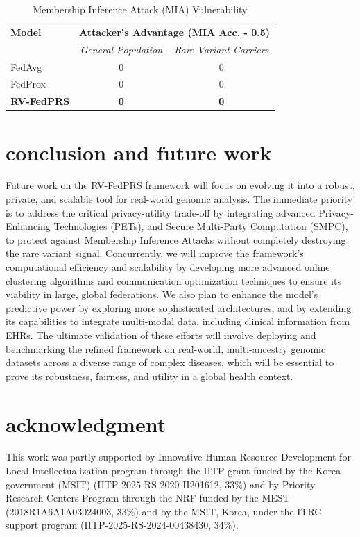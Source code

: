 \documentclass[conference]{IEEEtran}
\begin{document}
\begin{table}[h!]
\centering
\caption{Membership Inference Attack (MIA) Vulnerability}
\label{tab:privacy}
\begin{tabular}{lcc}
\hline
\textbf{Model} & \multicolumn{2}{c}{\textbf{Attacker's Advantage (MIA Acc. - 0.5)}} \\
& \textit{General Population} & \textit{Rare Variant Carriers} \\ \hline
FedAvg & 0 & 0 \\
FedProx & 0 & 0 \\
\textbf{RV-FedPRS} & \textbf{0} & \textbf{0} \\ \hline
\end{tabular}
\end{table}

\section{conclusion and future work}
\label{conclude}
Future work on the RV-FedPRS framework will focus on evolving it into a robust, private, and scalable tool for real-world genomic analysis. The immediate priority is to address the critical privacy-utility trade-off by integrating advanced Privacy-Enhancing Technologies (PETs), and Secure Multi-Party Computation (SMPC), to protect against Membership Inference Attacks without completely destroying the rare variant signal. Concurrently, we will improve the framework's computational efficiency and scalability by developing more advanced online clustering algorithms and communication optimization techniques to ensure its viability in large, global federations. We also plan to enhance the model's predictive power by exploring more sophisticated architectures, and by extending its capabilities to integrate multi-modal data, including clinical information from EHRs. The ultimate validation of these efforts will involve deploying and benchmarking the refined framework on real-world, multi-ancestry genomic datasets across a diverse range of complex diseases, which will be essential to prove its robustness, fairness, and utility in a global health context.

\section *{acknowledgment}
\scriptsize
\vspace{-0.1cm}
This work was partly supported by Innovative Human Resource Development for Local Intellectualization program through the IITP grant funded by the Korea government (MSIT) (IITP-2025-RS-2020-II201612, 33\%) and by Priority Research Centers Program through the NRF funded by the MEST (2018R1A6A1A03024003, 33\%) and by the MSIT, Korea, under the ITRC support program (IITP-2025-RS-2024-00438430, 34\%).

\balance


\end{document}

